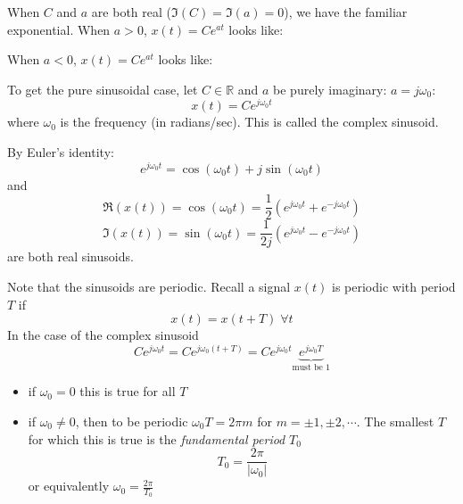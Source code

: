 When $C$ and $a$ are both real ($\Im(C) = \Im(a) = 0$), we have the familiar exponential. When $a > 0$, $x(t) = C e^{a t}$ looks like:

\begin{center}   
\end{center}

When $a < 0$, $x(t) = C e^{a t}$ looks like:

\begin{center}
\end{center}

To get the pure sinusoidal case, let $C \in \mathbb{R}$ and $a$ be purely imaginary: $a = j\omega_0$:
\[
x(t) = Ce^{j\omega_0 t}
\]
where $\omega_0$ is the frequency (in radians/sec). This is called the complex sinusoid.

By Euler's identity:
\[
e^{j\omega_0 t} = \cos(\omega_0 t) + j\sin(\omega_0 t)
\]
and
\[
\Re(x(t)) = \cos(\omega_0 t) = \frac{1}{2}\left( e^{j\omega_0 t} + e^{-j\omega_0 t} \right)
\]
\[
\Im(x(t)) = \sin(\omega_0 t) = \frac{1}{2j}\left( e^{j\omega_0 t} - e^{-j\omega_0 t} \right)
\]
are both real sinusoids.

Note that the sinusoids are periodic. Recall a signal $x(t)$ is periodic with period $T$ if
\[
x(t) = x(t+T) \; \forall t
\]
In the case of the complex sinusoid
\[
Ce^{j\omega_0 t} = Ce^{j\omega_0 (t+T)}= Ce^{j\omega_0 t}\underbrace{e^{j\omega_0 T}}_{\text{must be 1}}
\]

\begin{itemize}
\item if $\omega_0 = 0$ this is true for all $T$
\item if $\omega_0 \neq 0$, then to be periodic $\omega_0 T = 2\pi m$ for $m = \pm 1, \pm 2, \cdots$. The smallest $T$ for which this is true is the {\it fundamental period} $T_0$
  \[
  T_0 = \frac{2\pi}{|\omega_0|}
  \]
  or equivalently $\omega_0 = \frac{2\pi}{T_0}$
\end{itemize}

